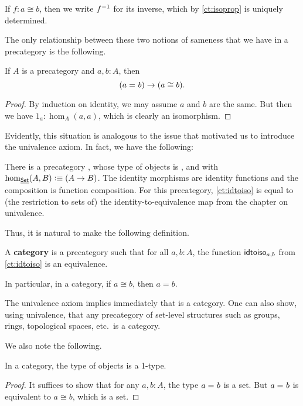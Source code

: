 If $f:a\cong b$, then we write ${f}^{-1}$ for its inverse, which by \autoref{ct:isoprop} is uniquely determined.

The only relationship between these two notions of sameness that we have in a precategory is the following.

\begin{lem}\label{ct:idtoiso}
  If $A$ is a precategory and $a,b:A$, then
  \[(a =_{} b)\to (a \cong b).\]
\end{lem}
\begin{proof}
  By induction on identity, we may assume $a$ and $b$ are the same.
  But then we have $1_a:\hom_A(a,a)$, which is clearly an isomorphism.
\end{proof}

Evidently, this situation is analogous to the issue that motivated us to introduce the univalence axiom.
In fact, we have the following:

\begin{eg}\label{ct:precatset}
  There is a precategory \uset, whose type of objects is \set, and with $\hom_{\underline{\mathsf{Set}}}(A,B) \vcentcolon\equiv (A\to B)$.
  The identity morphisms are identity functions and the composition is function composition.
  For this precategory, \autoref{ct:idtoiso} is equal to (the restriction to sets of) the identity-to-equivalence map from the chapter on univalence.
\end{eg}

Thus, it is natural to make the following definition.

\begin{defn}\label{ct:category}
  A \textbf{category} is a precategory such that for all $a,b:A$, the function $\mathsf{idtoiso}_{a,b}$ from \autoref{ct:idtoiso} is an equivalence.
\end{defn}

In particular, in a category, if $a\cong b$, then $a=b$.

\begin{eg}\label{ct:eg:set}
  The univalence axiom implies immediately that \uset is a category.
  One can also show, using univalence, that any precategory of set-level structures such as groups, rings, topological spaces, etc.\ is a category.
\end{eg}

We also note the following.

\begin{lem}\label{ct:obj-1type}
  In a category, the type of objects is a 1-type.
\end{lem}
\begin{proof}
  It suffices to show that for any $a,b:A$, the type $a =_{} b$ is a set.
  But $a =_{} b$ is equivalent to $a \cong b$, which is a set.
\end{proof}

